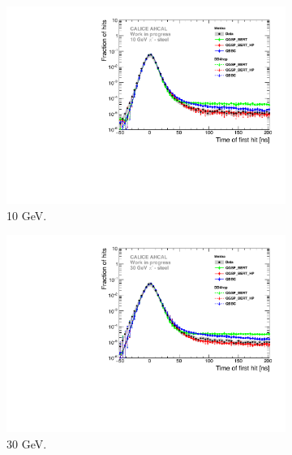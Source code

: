 \begin{figure}[htbp!]
	\begin{subfigure}[t]{0.5\textwidth}
		\centering
		\includegraphics[width=1\textwidth]{chap5/fig_AHCAL_timing/Pions/Comparison_SimData_Pion10GeV_LateClusters.pdf}
		\caption{10 GeV.} \label{fig:dNdt_SimData_10GeV}
	\end{subfigure}
	\hfill
	\begin{subfigure}[t]{0.5\textwidth}
		\centering
		\includegraphics[width=1\textwidth]{chap5/fig_AHCAL_timing/Pions/Comparison_SimData_Pion30GeV_LateClusters.pdf}
		\caption{30 GeV.}\label{fig:dNdt_SimData_30GeV}
	\end{subfigure}
	\begin{subfigure}[t]{0.5\textwidth}
		\centering

\end{subfigure}
\end{figure}
